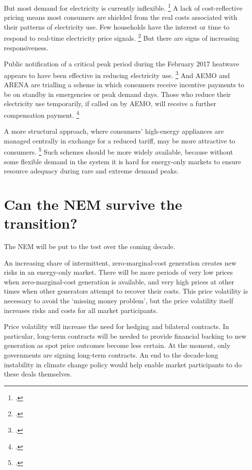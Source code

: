 \documentclass[FrontPage]{grattan}
\begin{document}
But most demand for electricity is currently inflexible.%
\footcites{AEMO2017ESOO}{CSIRO2015CostReflectivePricing}{fan2011price}{reiss2005household}
A lack of cost-reflective pricing means most consumers are shielded from the real costs associated with their patterns of electricity use. Few households have the interest or time to respond to real-time electricity price signals.%
\footcite{CSIRO2015CostReflectivePricing}
But there are signs of increasing responsiveness.

Public notification of a critical peak period during the February 2017 heatwave appears to have been effective in reducing electricity use.%
\footcite{OKane2017EnergySecurityTaskforceInitialReport}
And AEMO and ARENA are trialling a scheme in which consumers receive incentive payments to be on standby in emergencies or peak demand days. Those who reduce their electricity use temporarily, if called on by AEMO, will receive a further compensation payment.%
\footcite{AEMOARENA2017DemandTrial}

A more structural approach, where consumers' high-energy appliances are managed centrally in exchange for a reduced tariff, may be more attractive to consumers.%
\footcite{CSIRO2015CostReflectivePricing}
Such schemes should be more widely available, because without some flexible demand in the system it is hard for energy-only markets to ensure resource adequacy during rare and extreme demand peaks.

\section{Can the NEM survive the transition?}\label{sec:can-the-nem-survive-the-transition}
The NEM will be put to the test over the coming decade.

An increasing share of intermittent, zero-marginal-cost generation creates new risks in an energy-only market. There will be more periods of very low prices when zero-marginal-cost generation is available, and very high prices at other times when other generators attempt to recover their costs. This price volatility is necessary to avoid the `missing money problem', but the price volatility itself increases risks and costs for all market participants.

Price volatility will increase the need for hedging and bilateral contracts. In particular, long-term contracts will be needed to provide financial backing to new generation as spot price outcomes become less certain. At the moment, only governments are signing long-term contracts. An end to the decade-long instability in climate change policy would help enable market participants to do these deals themselves.
\end{document}
